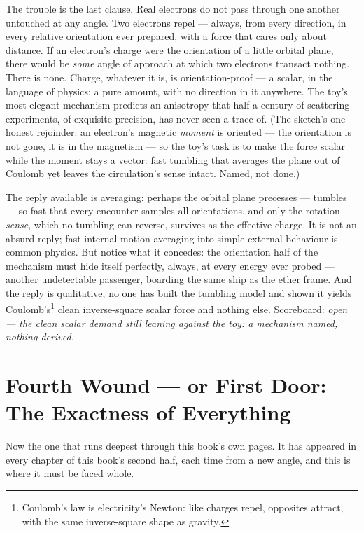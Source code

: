 \documentclass[fontsize=11pt,paper=a4,pagesize=auto,parskip=half-]{scrbook}
\begin{document}
The trouble is the last clause. Real electrons do not pass through one another untouched at any angle. Two electrons repel --- always, from every direction, in every relative orientation ever prepared, with a force that cares only about distance. If an electron's charge were the orientation of a little orbital plane, there would be \emph{some} angle of approach at which two electrons transact nothing. There is none. Charge, whatever it is, is orientation-proof --- a scalar, in the language of physics: a pure amount, with no direction in it anywhere. The toy's most elegant mechanism predicts an anisotropy that half a century of scattering experiments, of exquisite precision, has never seen a trace of. (The sketch's one honest rejoinder: an electron's magnetic \emph{moment} is oriented --- the orientation is not gone, it is in the magnetism --- so the toy's task is to make the force scalar while the moment stays a vector: fast tumbling that averages the plane out of Coulomb yet leaves the circulation's sense intact. Named, not done.)

The reply available is averaging: perhaps the orbital plane precesses --- tumbles --- so fast that every encounter samples all orientations, and only the rotation-\emph{sense}, which no tumbling can reverse, survives as the effective charge. It is not an absurd reply; fast internal motion averaging into simple external behaviour is common physics. But notice what it concedes: the orientation half of the mechanism must hide itself perfectly, always, at every energy ever probed --- another undetectable passenger, boarding the same ship as the ether frame. And the reply is qualitative; no one has built the tumbling model and shown it yields Coulomb's\footnote{Coulomb's law is electricity's Newton: like charges repel, opposites attract, with the same inverse-square shape as gravity.} clean inverse-square scalar force and nothing else. Scoreboard: \emph{open --- the clean scalar demand still leaning against the toy: a mechanism named, nothing derived.}

\section{Fourth Wound --- or First Door: The Exactness of Everything}

Now the one that runs deepest through this book's own pages. It has appeared in every chapter of this book's second half, each time from a new angle, and this is where it must be faced whole.
\end{document}
